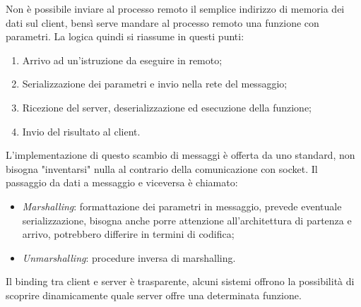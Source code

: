 Non è possibile inviare al processo remoto il semplice indirizzo di memoria dei 
dati sul client, bensì serve mandare al processo remoto una funzione con parametri.
La logica quindi si riassume in questi punti:
\begin{enumerate}
    \item Arrivo ad un'istruzione da eseguire in remoto;
    \item Serializzazione dei parametri e invio nella rete del messaggio;
    \item Ricezione del server, deserializzazione ed esecuzione della funzione;
    \item Invio del risultato al client.
\end{enumerate}
L'implementazione di questo scambio di messaggi è offerta da uno standard, 
non bisogna "inventarsi" nulla al contrario della comunicazione con socket.
Il passaggio da dati a messaggio e viceversa è chiamato:
\begin{itemize}
    \item \emph{Marshalling}: formattazione dei parametri in messaggio, prevede
    eventuale serializzazione, bisogna anche porre attenzione all'architettura
    di partenza e arrivo, potrebbero differire in termini di codifica;
    \item \emph{Unmarshalling}: procedure inversa di marshalling.
\end{itemize}
Il binding tra client e server è trasparente, alcuni sistemi offrono la possibilità 
di scoprire dinamicamente quale server offre una determinata funzione.

